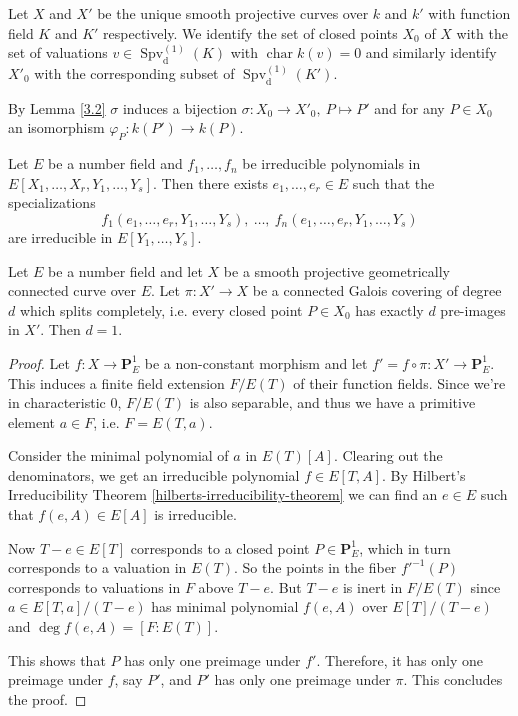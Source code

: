 Let $X$ and $X'$ be the unique smooth projective curves over $k$ and $k'$ with function field $K$ and $K'$ respectively. We identify the set of closed points $X_0$ of $X$ with the set of valuations $v\in\operatorname{Spv}_\text{d}^{(1)}(K)$ with $\operatorname{char} k(v)=0$ and similarly identify $X'_0$ with the corresponding subset of $\operatorname{Spv}_\text{d}^{(1)}(K')$. 

By Lemma \ref{3.2} $\sigma$ induces a bijection $\sigma: X^{\phantom{'}}_0\to X'_0,\ P\mapsto P'$ and for any $P\in X_0$ an isomorphism $\varphi_P: k(P')\to k(P)$.

\begin{theorem}\label{hilberts-irreducibility-theorem}
Let $E$ be a number field and $f_1,\ldots, f_n$ be irreducible polynomials in $E[X_1,\ldots,X_r,Y_1,\ldots,Y_s]$. Then there exists $e_1,\ldots,e_r\in E$ such that the specializations
\[ f_1(e_1,\ldots,e_r,Y_1,\ldots,Y_s),\ \ldots,\ f_n(e_1,\ldots,e_r,Y_1,\ldots,Y_s) \]
are irreducible in $E[Y_1,\ldots,Y_s]$.
\end{theorem}

\begin{lemma}\label{4.1}
Let $E$ be a number field and let $X$ be a smooth projective geometrically connected curve over $E$. Let $\pi:X'\to X$ be a connected Galois covering of degree $d$ which splits completely, i.e. every closed point $P\in X_0$ has exactly $d$ pre-images in $X'$. Then $d=1$.
\end{lemma}

\begin{proof}
Let $f: X\to\mathbf{P}^1_E$ be a non-constant morphism and let $f' =  f\circ \pi: X'\to\mathbf{P}^1_E$. This induces a finite field extension $F/E(T)$ of their function fields. Since we're in characteristic $0$, $F/E(T)$ is also separable, and thus we have a primitive element $a\in F$, i.e. $F = E(T,a)$. 

Consider the minimal polynomial of $a$ in $E(T)[A]$. Clearing out the denominators, we get an irreducible polynomial $f\in E[T,A]$. By Hilbert's Irreducibility Theorem \ref{hilberts-irreducibility-theorem} we can find an $e\in E$ such that $f(e,A)\in E[A]$ is irreducible. 

Now $T-e\in E[T]$ corresponds to a closed point $P\in \mathbf{P}^1_E$, which in turn corresponds to a valuation in $E(T)$. So the points in the fiber $f'^{-1}(P)$ corresponds to valuations in $F$ above $T-e$. But $T-e$ is inert in $F/E(T)$ since $a\in E[T,a]/(T-e)$ has minimal polynomial $f(e,A)$ over $E[T]/(T-e)$ and $\deg f(e,A) = [F:E(T)]$. 

This shows that $P$ has only one preimage under $f'$. Therefore, it has only one preimage under $f$, say $P'$, and $P'$ has only one preimage under $\pi$. This concludes the proof.
\end{proof}

